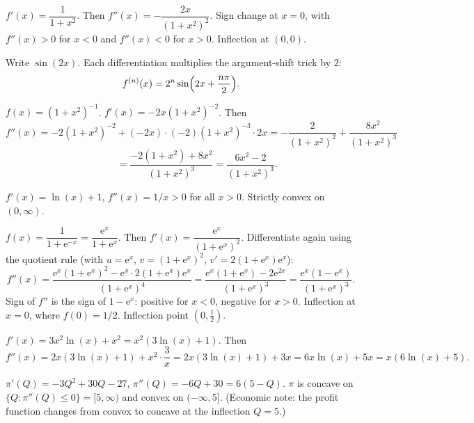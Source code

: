 \begin{solutions}
  \item $f'(x)=\dfrac{1}{1+x^{2}}$. Then
        $f''(x)=-\dfrac{2x}{(1+x^{2})^{2}}$. Sign change at $x=0$, with
        $f''(x)>0$ for $x<0$ and $f''(x)<0$ for $x>0$. Inflection at
        $(0,0)$.

  \item Write $\sin(2x)$. Each differentiation multiplies the
        argument-shift trick by $2$:
        \[
          f^{(n)}(x)=2^{n}\sin\Bigl(2x+\frac{n\pi}{2}\Bigr) .
        \]

  \item $f(x)=(1+x^{2})^{-1}$. $f'(x)=-2x(1+x^{2})^{-2}$. Then
        \[
          f''(x)=-2(1+x^{2})^{-2}+(-2x)\cdot(-2)(1+x^{2})^{-3}\cdot 2x
                =-\frac{2}{(1+x^{2})^{2}}+\frac{8x^{2}}{(1+x^{2})^{3}}
        \]
        \[
          \phantom{f''(x)}=\frac{-2(1+x^{2})+8x^{2}}{(1+x^{2})^{3}}
                =\frac{6x^{2}-2}{(1+x^{2})^{3}} .
        \]

  \item $f'(x)=\ln(x)+1$, $f''(x)=1/x>0$ for all $x>0$. Strictly convex
        on $(0,\infty)$.

  \item $f(x)=\dfrac{1}{1+\mathrm{e}^{-x}}=\dfrac{\mathrm{e}^{x}}{1+\mathrm{e}^{x}}$.
        Then $f'(x)=\dfrac{\mathrm{e}^{x}}{(1+\mathrm{e}^{x})^{2}}$.
        Differentiate again using the quotient rule (with $u=\mathrm{e}^{x}$,
        $v=(1+\mathrm{e}^{x})^{2}$, $v'=2(1+\mathrm{e}^{x})\mathrm{e}^{x}$):
        \[
          f''(x)=\frac{\mathrm{e}^{x}(1+\mathrm{e}^{x})^{2}
                       -\mathrm{e}^{x}\cdot 2(1+\mathrm{e}^{x})\mathrm{e}^{x}}
                       {(1+\mathrm{e}^{x})^{4}}
                =\frac{\mathrm{e}^{x}(1+\mathrm{e}^{x})-2\mathrm{e}^{2x}}
                       {(1+\mathrm{e}^{x})^{3}}
                =\frac{\mathrm{e}^{x}(1-\mathrm{e}^{x})}{(1+\mathrm{e}^{x})^{3}} .
        \]
        Sign of $f''$ is the sign of $1-\mathrm{e}^{x}$: positive for
        $x<0$, negative for $x>0$. Inflection at $x=0$, where
        $f(0)=1/2$. Inflection point $(0,\tfrac12)$.

  \item $f'(x)=3x^{2}\ln(x)+x^{2}=x^{2}(3\ln(x)+1)$. Then
        \[
          f''(x)=2x(3\ln(x)+1)+x^{2}\cdot\frac{3}{x}
                =2x(3\ln(x)+1)+3x
                =6x\ln(x)+5x=x(6\ln(x)+5) .
        \]

  \item $\pi'(Q)=-3Q^{2}+30Q-27$, $\pi''(Q)=-6Q+30=6(5-Q)$. $\pi$ is
        concave on $\{Q:\pi''(Q)\leq 0\}=[5,\infty)$ and convex on
        $(-\infty,5]$. (Economic note: the profit function changes from
        convex to concave at the inflection $Q=5$.)


\end{solutions}
